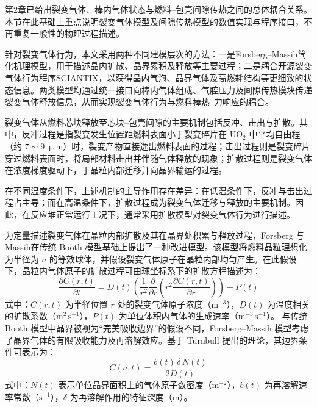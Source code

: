 第2章已给出裂变气体、棒内气体状态与燃料--包壳间隙传热之间的总体耦合关系。本节在此基础上重点说明裂变气体模型及间隙传热模型的数值实现与程序接口，不再重复一般性的物理过程描述。

针对裂变气体行为，本文采用两种不同建模层次的方法：一是Forsberg--Massih简化机理模型，用于描述晶内扩散、晶界累积及释放等主要过程；二是耦合开源裂变气体行为程序SCIANTIX，以获得晶内气泡、晶界气体及高燃耗结构等更细致的状态信息。两类模型均通过统一接口向棒内气体组成、气腔压力及间隙传热模块传递裂变气体释放信息，从而实现裂变气体行为与燃料棒热--力响应的耦合。


裂变气体从燃料芯块释放至芯块--包壳间隙的主要机制包括反冲、击出与扩散。其中，反冲过程是指裂变发生位置距燃料表面小于裂变碎片在 $\mathrm{UO_2}$ 中平均自由程（约 $7\sim9~\upmu\mathrm{m}$）时，裂变产物直接逸出燃料表面的过程；击出过程则是裂变碎片穿过燃料表面时，将局部材料击出并伴随气体释放的现象；扩散过程则是裂变气体在浓度梯度驱动下，于晶粒内部迁移并向晶界输运的过程。

在不同温度条件下，上述机制的主导作用存在差异：在低温条件下，反冲与击出过程占主导；而在高温条件下，扩散过程成为裂变气体迁移与释放的主要机制。因此，在反应堆正常运行工况下，通常采用扩散模型对裂变气体行为进行描述。

为定量描述裂变气体在晶粒内部扩散及其在晶界处积累与释放过程，Forsberg 与 Massih\cite{forsbergDiffusionTheoryFission1985}在传统 Booth 模型基础上提出了一种改进模型。该模型将燃料晶粒理想化为半径为 $a$ 的等效球体，并假设裂变气体原子在晶粒内部均匀产生。在此假设下，晶粒内气体原子的扩散过程可由球坐标系下的扩散方程描述为：
\begin{equation}
	\frac{\partial C(r,t)}{\partial t}
	= D(t)\left(\frac{1}{r^2}\frac{\partial}{\partial r}\left(r^2 \frac{\partial C(r,t)}{\partial r}\right)\right)
	+ P(t)
\end{equation}
\noindent 式中：$C(r,t)$ 为半径位置 $r$ 处的裂变气体原子浓度（$\mathrm{m^{-3}}$），$D(t)$ 为温度相关的扩散系数（$\mathrm{m^2\,s^{-1}}$），$P(t)$ 为单位体积内气体的生成速率（$\mathrm{m^{-3}\,s^{-1}}$）。
与传统 Booth 模型中晶界被视为“完美吸收边界”的假设不同，Forsberg--Massih 模型考虑了晶界气体的有限吸收能力及再溶解效应。基于 Turnbull 提出的理论，其边界条件可表示为：
\begin{equation}
	C(a,t) = \frac{b(t)\,\delta\,N(t)}{2D(t)}
\end{equation}
\noindent 式中：$N(t)$ 表示单位晶界面积上的气体原子数密度（$\mathrm{m^{-2}}$），$b(t)$ 为再溶解速率常数（$\mathrm{s^{-1}}$），$\delta$ 为再溶解作用的特征深度（$\mathrm{m}$）。


